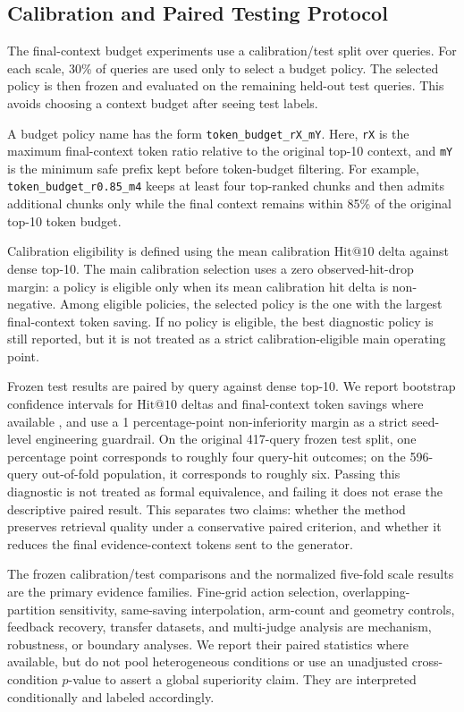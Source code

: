 \subsection{Calibration and Paired Testing Protocol}
\label{sec:05-experimental-setup:calibration-and-paired-testing-protocol}

The final-context budget experiments use a calibration/test split over queries. For each scale, 30\% of queries are used only to select a budget policy. The selected policy is then frozen and evaluated on the remaining held-out test queries. This avoids choosing a context budget after seeing test labels.

A budget policy name has the form \nolinkurl{token_budget_rX_mY}. Here, \nolinkurl{rX} is the maximum final-context token ratio relative to the original top-10 context, and \nolinkurl{mY} is the minimum safe prefix kept before token-budget filtering. For example, \nolinkurl{token_budget_r0.85_m4} keeps at least four top-ranked chunks and then admits additional chunks only while the final context remains within 85\% of the original top-10 token budget.

Calibration eligibility is defined using the mean calibration $\mathrm{Hit@10}$ delta against dense top-10. The main calibration selection uses a zero observed-hit-drop margin: a policy is eligible only when its mean calibration hit delta is non-negative. Among eligible policies, the selected policy is the one with the largest final-context token saving. If no policy is eligible, the best diagnostic policy is still reported, but it is not treated as a strict calibration-eligible main operating point.

Frozen test results are paired by query against dense top-10. We report bootstrap confidence intervals for $\mathrm{Hit@10}$ deltas and final-context token savings where available \citep{efron1979bootstrap}, and use a 1 percentage-point non-inferiority margin as a strict seed-level engineering guardrail. On the original 417-query frozen test split, one percentage point corresponds to roughly four query-hit outcomes; on the 596-query out-of-fold population, it corresponds to roughly six. Passing this diagnostic is not treated as formal equivalence, and failing it does not erase the descriptive paired result. This separates two claims: whether the method preserves retrieval quality under a conservative paired criterion, and whether it reduces the final evidence-context tokens sent to the generator.

The frozen calibration/test comparisons and the normalized five-fold scale results are the primary evidence families. Fine-grid action selection, overlapping-partition sensitivity, same-saving interpolation, arm-count and geometry controls, feedback recovery, transfer datasets, and multi-judge analysis are mechanism, robustness, or boundary analyses. We report their paired statistics where available, but do not pool heterogeneous conditions or use an unadjusted cross-condition $p$-value to assert a global superiority claim. They are interpreted conditionally and labeled accordingly.

